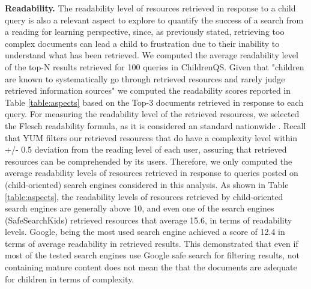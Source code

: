 \documentclass{sig-alternate-05-2015}
\begin{document}
\noindent
\textbf{Readability.} The readability level of resources retrieved in response to a child query is also a relevant aspect to explore to quantify the success of a search from a reading for learning perspective, since, as previously stated, retrieving too complex documents can lead a child to frustration due to their inability to understand what has been retrieved. We computed the average readability level of the top-N results retrieved for 100 queries in ChildrenQS. Given that "children are known to systematically go through retrieved resources and rarely judge retrieved information sources" \cite{Gra03} we computed the readability scores reported in Table \ref{table:aspects} based on the Top-3 documents retrieved in response to each query. For measuring the readability level of the retrieved resources, we selected the Flesch \cite{Fle48} readability formula, as it is considered an standard nationwide \cite{gru80}. Recall that YUM filters our retrieved resources that do have a complexity level within +/- 0.5 deviation from the reading level of each user, assuring that retrieved resources can be comprehended by its users.   Therefore, we only computed the average readability levels of resources retrieved in response to queries posted on (child-oriented) search engines considered in this analysis. As shown in Table \ref{table:aspects}, the readability levels of resources retrieved by child-oriented search engines are generally above 10, and even one of the search engines (SafeSearchKids) retrieved resources that average 15.6, in terms of readability levels. Google, being the most used search engine achieved a score of 12.4 in terms of average readability in retrieved results. This demonstrated that even if most of the tested search engines use Google safe search for filtering results, not containing mature content does not mean the that the documents are adequate for children in terms of complexity.\\
\end{document}
